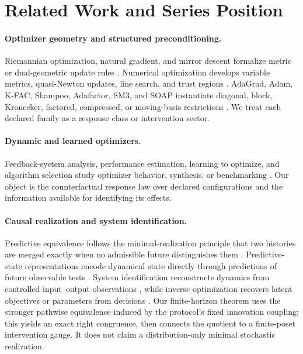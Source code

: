 \section{Related Work and Series Position}
\label{sec:related-work}

\paragraph{Optimizer geometry and structured preconditioning.}
Riemannian optimization, natural gradient, and mirror descent formalize metric or dual-geometric update rules \citep{absil2008optimization,amari1998natural,beck2003mirror,boumal2023introduction}.  Numerical optimization develops variable metrics, quasi-Newton updates, line search, and trust regions \citep{nocedal2006numerical,combettes2014variable,parikh2014proximal}.  AdaGrad, Adam, K-FAC, Shampoo, Adafactor, SM3, and SOAP instantiate diagonal, block, Kronecker, factored, compressed, or moving-basis restrictions \citep{duchi2011adagrad,kingma2014adam,martens2015kfac,gupta2018shampoo,shazeer2018adafactor,anil2019sm3,vyas2025soap}.  We treat each declared family as a response class or intervention sector.

\paragraph{Dynamic and learned optimizers.}
Feedback-system analysis, performance estimation, learning to optimize, and algorithm selection study optimizer behavior, synthesis, or benchmarking \citep{lessard2016analysis,drori2014performance,taylor2017smooth,andrychowicz2016learning,metz2022velo,kerschke2019automated,dahl2023algoperf}.  Our object is the counterfactual response law over declared configurations and the information available for identifying its effects.

\paragraph{Causal realization and system identification.}
Predictive equivalence follows the minimal-realization principle that two histories are merged exactly when no admissible future distinguishes them \citep{nerode1958linear}.  Predictive-state representations encode dynamical state directly through predictions of future observable tests \citep{singh2004predictive}.  System identification reconstructs dynamics from controlled input--output observations \citep{ljung1999system}, while inverse optimization recovers latent objectives or parameters from decisions \citep{ahuja2001inverse}.  Our finite-horizon theorem uses the stronger pathwise equivalence induced by the protocol's fixed innovation coupling; this yields an exact right congruence, then connects the quotient to a finite-poset intervention gauge.  It does not claim a distribution-only minimal stochastic realization.

